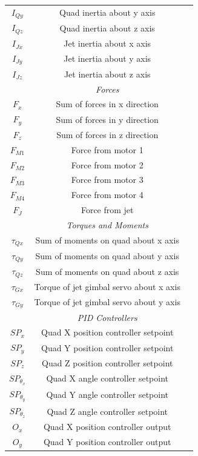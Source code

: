 \documentclass[11pt]{article}
\begin{document}
\begin{center}
\begin{longtable}{|ccc|}
    $I_{Qy}$ & Quad inertia about y axis & \\
    $I_{Qz}$ & Quad inertia about z axis & \\
    $I_{Jx}$ & Jet inertia about x axis & \\
    $I_{Jy}$ & Jet inertia about y axis & \\
    $I_{Jz}$ & Jet inertia about z axis & \\
    \hline
    & \emph{Forces} & \\
    \hline
    $F_x$ & Sum of forces in x direction & \\
    $F_y$ & Sum of forces in y direction & \\
    $F_z$ & Sum of forces in z direction & \\
    $F_{M1}$ & Force from motor 1 & \\
    $F_{M2}$ & Force from motor 2 & \\
    $F_{M3}$ & Force from motor 3 & \\
    $F_{M4}$ & Force from motor 4 & \\
    $F_J$ & Force from jet & \\
    \hline
    & \emph{Torques and Moments} & \\
    \hline
    $\tau_{Qx}$ & Sum of moments on quad about x axis & \\
    $\tau_{Qy}$ & Sum of moments on quad about y axis & \\
    $\tau_{Qz}$ & Sum of moments on quad about z axis & \\
    $\tau_{Gx}$ & Torque of jet gimbal servo about x axis & \\
    $\tau_{Gy}$ & Torque of jet gimbal servo about y axis & \\
    \hline
    & \emph{PID Controllers} & \\
    \hline
    $SP_x$ & Quad X position controller setpoint & \\
    $SP_y$ & Quad Y position controller setpoint & \\
    $SP_z$ & Quad Z position controller setpoint & \\
    $SP_{\theta_x}$ & Quad X angle controller setpoint & \\
    $SP_{\theta_y}$ & Quad Y angle controller setpoint & \\
    $SP_{\theta_z}$ & Quad Z angle controller setpoint & \\
    $O_x$ & Quad X position controller output & \\
    $O_y$ & Quad Y position controller output & \\

\end{longtable}
\end{center}
\end{document}
